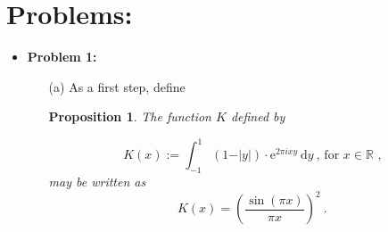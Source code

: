 \documentclass[12pt, reqno]{amsart}
\newtheorem{prop}{Proposition}[section]
\theoremstyle{definition}
\theoremstyle{remark}
\newcommand{\ud}{\mathrm{d}}
\begin{document}


\section{Problems:} 

\begin{itemize}

\vspace{0.2 cm}
\item {\bf{Problem 1:}} %




\vspace{0.1 cm}
\begin{itemize}
\item[(a)] As a first step, define

\begin{prop}
    The function $K$ defined by 

\begin{equation}
K(x):= \int_{-1}^1 \left(1 - \vert y \vert \right) \cdot \mathrm{e}^{2 \pi i x y} ~\ud y ~\mbox{, for $x \in \mathbb{R}$ ,}
\end{equation}
may be written as
\begin{equation}
K(x) = \left( \dfrac{\sin(\pi x)}{\pi x} \right)^2 ~\mbox{.}
\end{equation}
\end{prop}


\end{itemize}
\end{itemize}
\end{document}
